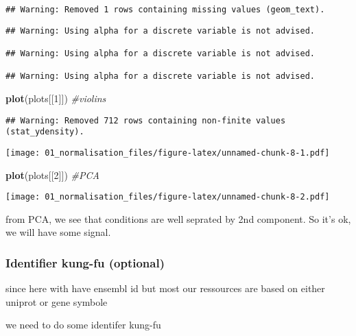 \documentclass[]{article}
\newenvironment{Shaded}{\begin{snugshade}}{\end{snugshade}}
\newcommand{\CommentTok}[1]{\textcolor[rgb]{0.56,0.35,0.01}{\textit{#1}}}
\newcommand{\DecValTok}[1]{\textcolor[rgb]{0.00,0.00,0.81}{#1}}
\newcommand{\KeywordTok}[1]{\textcolor[rgb]{0.13,0.29,0.53}{\textbf{#1}}}
\newcommand{\NormalTok}[1]{#1}
\begin{document}
\begin{verbatim}
## Warning: Removed 1 rows containing missing values (geom_text).
\end{verbatim}

\begin{verbatim}
## Warning: Using alpha for a discrete variable is not advised.

## Warning: Using alpha for a discrete variable is not advised.

## Warning: Using alpha for a discrete variable is not advised.
\end{verbatim}

\begin{Shaded}
\begin{Highlighting}[]
\KeywordTok{plot}\NormalTok{(plots[[}\DecValTok{1}\NormalTok{]]) }\CommentTok{#violins}
\end{Highlighting}
\end{Shaded}

\begin{verbatim}
## Warning: Removed 712 rows containing non-finite values (stat_ydensity).
\end{verbatim}

\texttt{[image: 01\_normalisation\_files/figure-latex/unnamed-chunk-8-1.pdf]}

\begin{Shaded}
\begin{Highlighting}[]
\KeywordTok{plot}\NormalTok{(plots[[}\DecValTok{2}\NormalTok{]]) }\CommentTok{#PCA}
\end{Highlighting}
\end{Shaded}

\texttt{[image: 01\_normalisation\_files/figure-latex/unnamed-chunk-8-2.pdf]}

from PCA, we see that conditions are well seprated by 2nd component. So
it's ok, we will have some signal.

\hypertarget{identifier-kung-fu-optional}{%
\subsubsection{Identifier kung-fu
(optional)}\label{identifier-kung-fu-optional}}

since here with have ensembl id but most our ressources are based on
either uniprot or gene symbole

we need to do some identifer kung-fu
\end{document}

